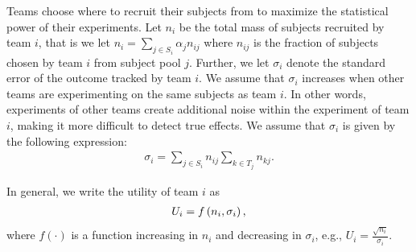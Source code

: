 \documentclass[12pt]{article}
\begin{document}
Teams choose where to recruit their subjects from to maximize the statistical power of their experiments. Let $n_i$ be the total mass of subjects recruited by team $i$, that is we let $n_i = \sum_{j \in S_i} \alpha_j n_{ij}$ where $n_{ij}$ is the fraction of subjects chosen by team $i$ from subject pool $j$. Further, we let $\sigma_i$ denote the standard error of the outcome tracked by team $i$. We assume that $\sigma_i$ increases when other teams are experimenting on the same subjects as team $i$. In other words, experiments of other teams create additional noise within the experiment of team $i$, making it more difficult to detect true effects. We assume that $\sigma_i$ is given by the following expression:
\begin{align}
\sigma_i = \sum_{j \in S_i} n_{ij} \sum_{k \in T_j} n_{kj}.
\end{align}

In general, we write the utility of team $i$ as
\begin{align}
U_i = f \left( n_i , \sigma_i \right),
\end{align}
where $f(\cdot)$ is a function increasing in $n_i$ and decreasing in $\sigma_i$, e.g., $U_i = \frac{\sqrt{n_i}}{\sigma_i}$.
\end{document}
